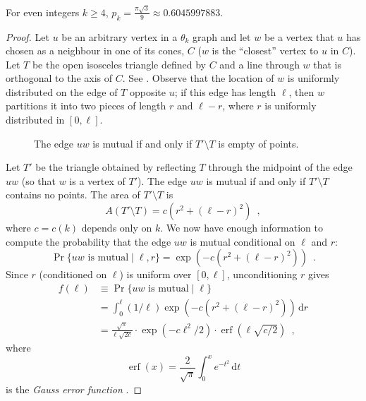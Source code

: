 \documentclass{patmorin}
\DeclareMathOperator{\erf}{erf}
\begin{document}
\begin{lem}
 For even integers $k\ge 4$, $p_k=\frac{\pi\sqrt{3}}{9}\approx 0.6045997883$.
\end{lem}

\begin{proof}
  Let $u$ be an arbitrary vertex in a $\theta_k$ graph and let $w$
  be a vertex that $u$ has chosen as a neighbour in one of its cones,
  $C$ ($w$ is the ``closest'' vertex to $u$ in $C$).  Let $T$ be the
  open isosceles triangle defined by $C$ and a line
  through $w$ that is orthogonal to the axis of $C$. See .
  Observe that the location of $w$ is uniformly distributed on the
  edge of $T$ opposite $u$;  if this edge has length $\ell$, then $w$
  partitions it into two pieces of length $r$ and $\ell-r$, where $r$
  is uniformly distributed in $[0,\ell]$.

  \begin{figure}
    \caption{The edge $uw$ is mutual if and only if $T'\setminus T$ 
       is empty of points.}
  \end{figure}
 
  Let $T'$ be the triangle obtained by reflecting $T$ through the midpoint
  of the edge $uw$ (so that $w$ is a vertex of $T'$). The edge $uw$ is
  mutual if and only if $T'\setminus T$ contains no points.  The area
  of $T'\setminus T$ is
  \[
     A(T'\setminus T) = c(r^2+(\ell-r)^2)  \enspace ,
  \]
  where $c=c(k)$ depends only on $k$.  We now have enough information
  to compute the probability that the edge $uw$ is mutual conditional
  on $\ell$ and $r$:
  \[
    \Pr\{\mbox{$uw$ is mutual} \mid \ell,r\} = \exp(-c(r^2+(\ell-r)^2))
      \enspace .
  \]
  Since $r$ (conditioned on $\ell$) is uniform over $[0,\ell]$, unconditioning
  $r$ gives
  \begin{align*}
    f(\ell) & \equiv \Pr\{\mbox{$uw$ is mutual} \mid \ell\} \\
     & = \int_0^\ell (1/\ell)\exp(-c(r^2+(\ell-r)^2))\,\mathrm{d}r \\
     & = \frac{\sqrt{\pi}}{\ell\sqrt{2c}}
            \cdot\exp(-c\ell^2/2)
            \cdot\erf(\ell\sqrt{c/2})  \enspace ,
  \end{align*}
  where 
  \[ \erf(x)=\frac{2}{\sqrt{\pi}}\int_0^x e^{-t^2}\,\mathrm{d}t \]
  is the \emph{Gauss error function} \cite{gauss-error}.  


\end{proof}
\end{document}
